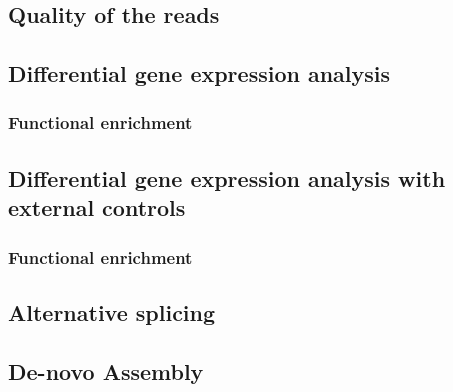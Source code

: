 \subsection{Quality of the reads}

\subsection{Differential gene expression analysis}
\subsubsection{Functional enrichment}
\subsection{Differential gene expression analysis with external controls}
\subsubsection{Functional enrichment}
\subsection{Alternative splicing}
\subsection{De-novo Assembly}
